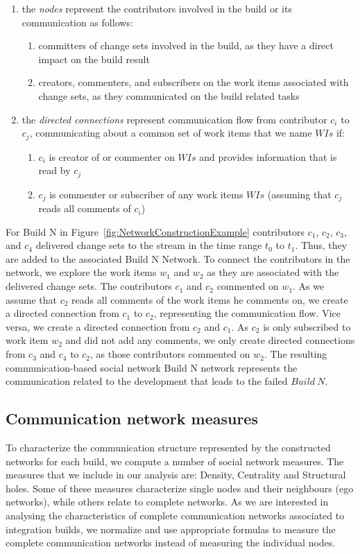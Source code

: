 \documentclass[12pt,oneside]{book}
\begin{document}
\begin{enumerate}
  \item the \emph{nodes} represent the contributors involved in the build or 
 its communication as follows:
  \begin{enumerate}
    \item committers of change sets involved in the build, as they have a
    direct impact on the build result
    \item creators, commenters, and subscribers on the work items associated with
    change sets, as they communicated on the build related tasks
  \end{enumerate}
  \item the \emph{directed connections} represent communication flow
  from contributor $c_i$ to $c_j$, communicating about a common set of
  work items that we name $WIs$ if:
  \begin{enumerate}
    \item $c_i$ is creator of or commenter on $WIs$ and provides
    information that is read by $c_j$
    \item $c_j$ is commenter or subscriber of any work items $WIs$ (assuming
    that $c_j$ reads all comments of $c_i$)
  \end{enumerate}
\end{enumerate}

For Build N in Figure~\ref{fig:NetworkConstructionExample} contributors $c_1$,
$c_2$, $c_3$, and $c_4$ delivered change sets to the stream in the time range $t_0$
to $t_1$. Thus, they are added to the associated Build N Network. To connect the
contributors in the network, we explore the work items $w_1$ and $w_2$ as they
are associated with the delivered change sets. The contributors $c_1$ and $c_2$
commented on $w_1$. As we assume that $c_2$ reads all comments of the work items
he comments on, we create a directed connection from $c_1$ to $c_2$, representing
the communication flow. Vice versa, we create a directed connection from $c_2$
and $c_1$. As $c_2$ is only subscribed to work item $w_2$ and did not add any
comments, we only create directed connections from $c_3$ and $c_4$ to $c_2$, as
those contributors commented on $w_2$. The resulting communication-based social
network Build N network represents the communication related to the development
that leads to the failed $Build~N$.

\subsection{Communication network measures}
To characterize the communication structure represented by the constructed
networks for each build, we compute a number of social network measures. The
measures that we include in our analysis are: Density, Centrality and Structural
holes. Some of these measures characterize single nodes and their neighbours (ego
networks), while others relate to complete networks. As we are interested in
analysing the characteristics of complete communication networks associated to
integration builds, we normalize and use appropriate formulas to measure the
complete communication networks instead of measuring the individual nodes.
\end{document}
